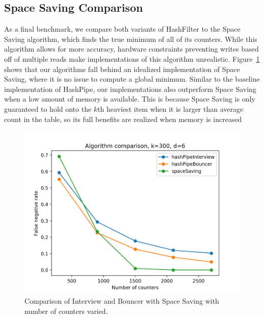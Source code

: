 \subsection{Space Saving Comparison}
As a final benchmark, we compare both variants of HashFilter to the Space Saving algorithm, which finds the true minimum of all of its counters. While this algorithm allows for more accuracy, hardware constraints preventing writes based off of multiple reads make implementations of this algorithm unrealistic. Figure~\ref{fig:spacesaver} shows that our algorithms fall behind an idealized implementation of Space Saving, where it is no issue to compute a global minimum. Similar to the baseline implementation of HashPipe, our implementations also outperform Space Saving when a low amount of memory is available. This is because Space Saving is only guaranteed to hold onto the $k$th heaviest item when it is larger than average count in the table, so its full benefits are realized when memory is increased
\begin{figure}[!htb]
  \centering
    \includegraphics[scale=0.42]{spacesaver}
     \caption{Comparison of Interview and Bouncer with Space Saving with number of counters varied.}
     \label{fig:spacesaver}
\end{figure}